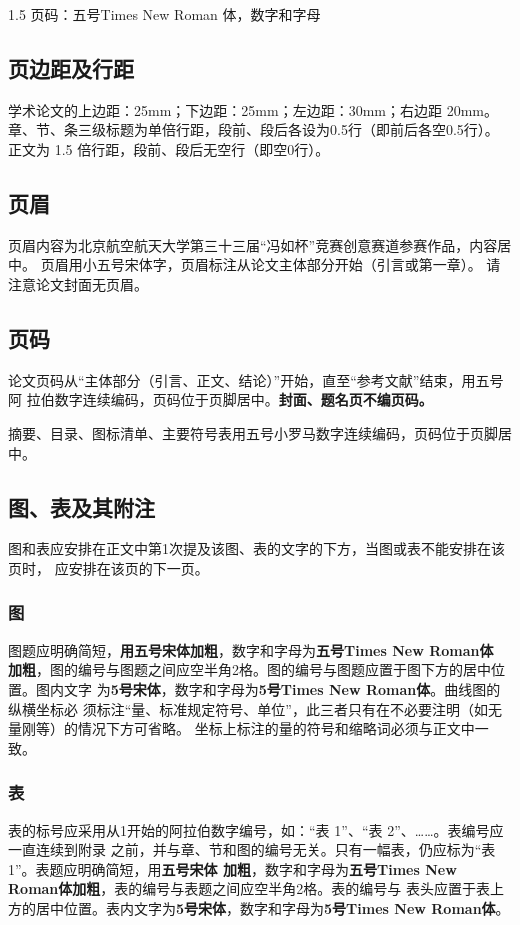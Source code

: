 \documentclass[zihao=-4]{ctexart}
\begin{document}
\begin{spacing}{1.5}
页码：五号Times New Roman 体，数字和字母\par

\subsection{页边距及行距}
学术论文的上边距：25mm；下边距：25mm；左边距：30mm；右边距 20mm。
章、节、条三级标题为单倍行距，段前、段后各设为0.5行（即前后各空0.5行）。
正文为 1.5 倍行距，段前、段后无空行（即空0行）。

\subsection{页眉}
页眉内容为北京航空航天大学第三十三届“冯如杯”竞赛创意赛道参赛作品，内容居中。
页眉用小五号宋体字，页眉标注从论文主体部分开始（引言或第一章）。
请注意论文封面无页眉。

\subsection{页码}
论文页码从“主体部分（引言、正文、结论）”开始，直至“参考文献”结束，用五号阿
拉伯数字连续编码，页码位于页脚居中。\textbf{封面、题名页不编页码。}

摘要、目录、图标清单、主要符号表用五号小罗马数字连续编码，页码位于页脚居中。

\subsection{图、表及其附注}
图和表应安排在正文中第1次提及该图、表的文字的下方，当图或表不能安排在该页时，
应安排在该页的下一页。

\subsubsection{图}
图题应明确简短，\textbf{用五号宋体加粗}，数字和字母为\textbf{五号Times New Roman体
加粗}，图的编号与图题之间应空半角2格。图的编号与图题应置于图下方的居中位置。图内文字
为\textbf{5号宋体}，数字和字母为\textbf{5号Times New Roman体}。曲线图的纵横坐标必
须标注“量、标准规定符号、单位”，此三者只有在不必要注明（如无量刚等）的情况下方可省略。
坐标上标注的量的符号和缩略词必须与正文中一致。

\subsubsection{表}
表的标号应采用从1开始的阿拉伯数字编号，如：“表 1”、“表 2”、……。表编号应一直连续到附录
之前，并与章、节和图的编号无关。只有一幅表，仍应标为“表 1”。表题应明确简短，用\textbf{五号宋体
加粗}，数字和字母为\textbf{五号Times New Roman体加粗}，表的编号与表题之间应空半角2格。表的编号与
表头应置于表上方的居中位置。表内文字为\textbf{5号宋体}，数字和字母为\textbf{5号Times New Roman体}。  


\end{spacing}
\end{document}
